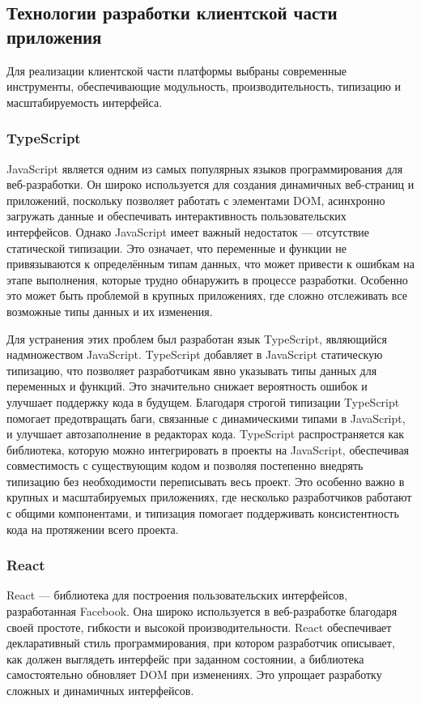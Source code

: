 \subsection{Технологии разработки клиентской части приложения}

Для реализации клиентской части платформы выбраны современные инструменты, обеспечивающие модульность, производительность, типизацию и масштабируемость интерфейса.

\subsubsection{TypeScript}
JavaScript является одним из самых популярных языков программирования для веб-разработки. Он широко используется для создания динамичных веб-страниц и приложений, поскольку позволяет работать с элементами DOM, асинхронно загружать данные и обеспечивать интерактивность пользовательских интерфейсов. Однако JavaScript имеет важный недостаток — отсутствие статической типизации. Это означает, что переменные и функции не привязываются к определённым типам данных, что может привести к ошибкам на этапе выполнения, которые трудно обнаружить в процессе разработки. Особенно это может быть проблемой в крупных приложениях, где сложно отслеживать все возможные типы данных и их изменения.

Для устранения этих проблем был разработан язык TypeScript, являющийся надмножеством JavaScript. TypeScript добавляет в JavaScript статическую типизацию, что позволяет разработчикам явно указывать типы данных для переменных и функций. Это значительно снижает вероятность ошибок и улучшает поддержку кода в будущем. Благодаря строгой типизации TypeScript помогает предотвращать баги, связанные с динамическими типами в JavaScript, и улучшает автозаполнение в редакторах кода. TypeScript распространяется как библиотека, которую можно интегрировать в проекты на JavaScript, обеспечивая совместимость с существующим кодом и позволяя постепенно внедрять типизацию без необходимости переписывать весь проект. Это особенно важно в крупных и м$ $асштабируемых приложениях, где несколько разработчиков работают с общими компонентами, и типизация помогает поддерживать консистентность кода на протяжении всего проекта.


\subsubsection{React}

React — библиотека для построения пользовательских интерфейсов, разработанная Facebook. Она широко используется в веб-разработке благодаря своей простоте, гибкости и высокой производительности. React обеспечивает декларативный стиль программирования, при котором разработчик описывает, как должен выглядеть интерфейс при заданном состоянии, а библиотека самостоятельно обновляет DOM при изменениях. Это упрощает разработку сложных и динамичных интерфейсов.

